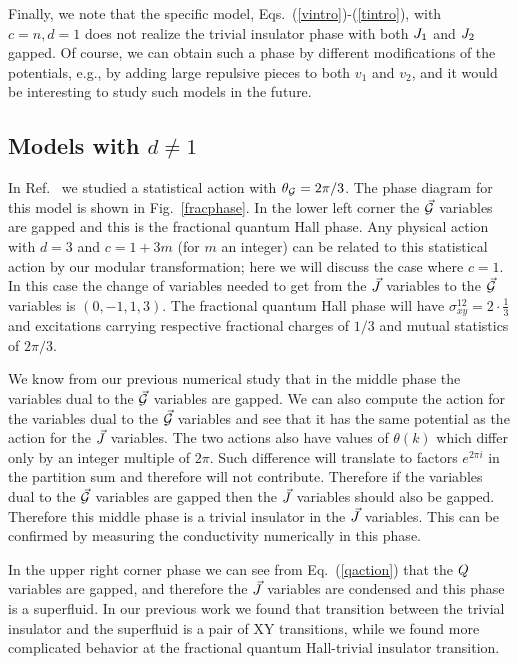 Finally, we note that the specific model, Eqs.~(\ref{vintro})-(\ref{tintro}), with $c=n, d=1$ does not realize the trivial insulator phase with both $J_1$ and $J_2$ gapped.  Of course, we can obtain such a phase by different modifications of the potentials, e.g., by adding large repulsive pieces to both $v_1$ and $v_2$, and it would be interesting to study such models in the future.


\subsection{Models with $d\neq 1$}
In Ref.~\cite{short_range3} we studied a statistical action with $\theta_{\cal{G}} = 2\pi/3$. The phase diagram for this model is shown in Fig.~\ref{fracphase}. In the lower left corner the $\vec{\mathcal{G}}$ variables are gapped and this is the fractional quantum Hall phase. Any physical action with $d=3$ and $c=1+3m$ (for $m$ an integer) can be related to this statistical action by our modular transformation; here we will discuss the case where $c=1$. In this case the change of variables needed to get from the $\vec{J}$ variables to the $\vec{\mathcal{G}}$ variables is $(0, -1, 1, 3)$. The fractional quantum Hall phase will have $\sigma^{12}_{xy}=2\cdot\frac{1}{3}$ and excitations carrying respective fractional charges of $1/3$ and mutual statistics of $2\pi/3$.

We know from our previous numerical study\cite{short_range3} that in the middle phase the variables dual to the $\vec{\mathcal{G}}$ variables are gapped. 
We can also compute the action for the variables dual to the $\vec{\mathcal{G}}$ variables and see that it has the same potential as the action for the $\vec{J}$ variables. The two actions also have values of $\theta(k)$ which differ only by an integer multiple of $2\pi$. Such difference will translate to factors $e^{2\pi i}$ in the partition sum and therefore will not contribute. Therefore if the variables dual to the $\vec{\mathcal{G}}$ variables are gapped then the $\vec{J}$ variables should also be gapped. Therefore this middle phase is a trivial insulator in the $\vec{J}$ variables. This can be confirmed by measuring the conductivity numerically in this phase. 

In the upper right corner phase we can see from Eq.~(\ref{qaction}) that the $Q$ variables are gapped,  and therefore the $\vec{J}$ variables are condensed and this phase is a superfluid.  In our previous work\cite{short_range3} we found that transition between the trivial insulator and the superfluid is a pair of XY transitions, while we found more complicated behavior at the fractional quantum Hall-trivial insulator transition. 

